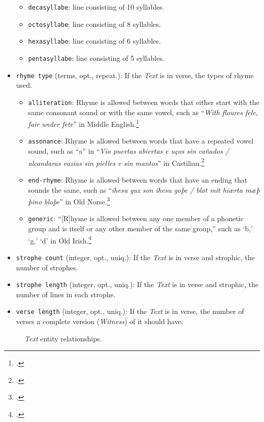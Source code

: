 \begin{itemize}
\begin{itemize}
            \item \texttt{decasyllabe}: line consisting of 10 syllables.
            \item \texttt{octosyllabe}: line consisting of 8 syllables.
            \item \texttt{hexasyllabe}: line consisting of 6 syllables.
            \item \texttt{pentasyllabe}: line consisting of 5 syllables.
        \end{itemize}
    \item \texttt{rhyme type} (terms, opt., repeat.): If the \textit{Text} is in verse, the types of rhyme used.
        \begin{itemize}
            \item \texttt{alliteration}: Rhyme is allowed between words that either start with the same consonant sound or with the same vowel, such as ``\textit{With floures fele, fair under fete}'' in Middle English.\footcite[][396]{Davis2002}
            \item \texttt{assonance}: Rhyme is allowed between words that have a repeated vowel sound, such as ``a'' in ``\textit{Vio puertas abiertas e uços sin cañados / alcandaras vazias sin pielles e sin mantos}'' in Castilian.\footcite[][364]{Gornall1995}
            \item \texttt{end-rhyme}: Rhyme is allowed between words that have an ending that sounds the same, such as ``\textit{ihesu guz son ihesu goþe / bløt mit hiærta mæþ þino bloþe}'' in Old Norse.\footcite[][423]{Layher2008}
            \item \texttt{generic}: ``[R]hyme is allowed between any one member of a phonetic group and is itself or any other member of the same group,'' such as `b,' `g,' `d' in Old Irish.\footcite[][822]{McKie1997}
        \end{itemize}
    \item \texttt{strophe count} (integer, opt., uniq.): If the \textit{Text} is in verse and strophic, the number of strophes.
    \item \texttt{strophe length} (integer, opt., uniq.): If the \textit{Text} is in verse and strophic, the number of lines in each strophe.
    \item \texttt{verse length} (integer, opt., uniq.): If the \textit{Text} is in verse, the number of verses a complete version (\textit{Witness}) of it should have.
\end{itemize}

\begin{figure}[ht]
    \begin{center}
        
    \end{center}
\label{fig:TextER}
\caption{\textit{Text} entity relationships.}
\end{figure}

